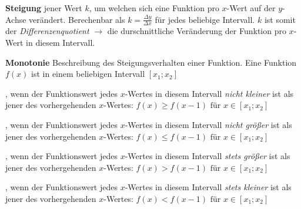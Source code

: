 \textbf{Steigung}  jener Wert $k$, um welchen sich eine Funktion pro $x$-Wert auf der $y$-Achse ver\"{a}ndert. Berechenbar als $k = \frac{\Delta y}{\Delta x}$ f\"{u}r jedes beliebige Intervall. $k$ ist somit der \emph{Differenzenquotient} $\rightarrow$ die durschnittliche Ver\"{a}nderung der Funktion pro $x$-Wert in diesem Intervall.

\begin{figure}[h!]
	\centering
\end{figure}

\textbf{Monotonie}  Beschreibung des Steigungsverhalten einer Funktion. Eine Funktion $f(x)$ ist in einem beliebigen Intervall $[x_{1}; x_{2}]$

\begin{itemize}
	, wenn der Funktionswert jedes $x$-Wertes in diesem Intervall \emph{nicht kleiner} ist als jener des vorhergehenden $x$-Wertes: $f(x) \geq f(x-1) \text{ f\"{u}r } x \in [x_{1}; x_{2}]$

	, wenn der Funktionswert jedes $x$-Wertes in diesem Intervall \emph{nicht gr\"{o}\ss{}er} ist als jener des vorhergehenden $x$-Wertes: $f(x) \leq f(x-1) \text{ f\"{u}r } x \in [x_{1}; x_{2}]$

	, wenn der Funktionswert jedes $x$-Wertes in diesem Intervall \emph{stets gr\"{o}\ss{}er} ist als jener des vorhergehenden $x$-Wertes: $f(x) > f(x-1) \text{ f\"{u}r } x \in [x_{1}; x_{2}]$

	, wenn der Funktionswert jedes $x$-Wertes in diesem Intervall \emph{stets kleiner} ist als jener des vorhergehenden $x$-Wertes: $f(x) < f(x-1) \text{ f\"{u}r } x \in [x_{1}; x_{2}]$

\end{itemize}

